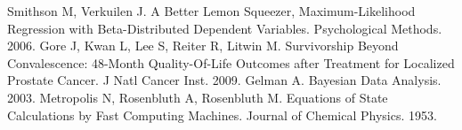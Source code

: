 

\begin{thebibliography}{9}
 Smithson M, Verkuilen J.  A Better Lemon Squeezer, Maximum-Likelihood Regression with Beta-Distributed Dependent Variables.  Psychological Methods.   2006.
 Gore J, Kwan L, Lee S, Reiter R, Litwin M.  Survivorship Beyond Convalescence: 48-Month Quality-Of-Life Outcomes after Treatment for Localized Prostate Cancer.  J Natl Cancer Inst.  2009.
 Gelman A.  Bayesian Data Analysis.  2003.
  Metropolis N, Rosenbluth A, Rosenbluth M.  Equations of State Calculations by Fast Computing Machines.  Journal of Chemical Physics.  1953.
\end{thebibliography}